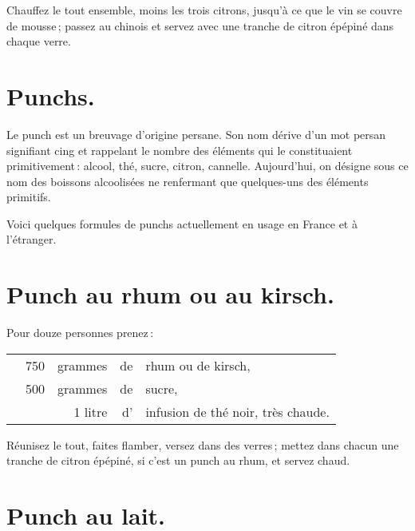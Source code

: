 Chauffez le tout ensemble, moins les trois citrons, jusqu'à ce que le vin se
couvre de mousse ; passez au chinois et servez avec une tranche de citron
épépiné dans chaque verre.

\section*{\centering Punchs.}
{}

Le punch est un breuvage d'origine persane. Son nom dérive d'un mot persan
signifiant cing et rappelant le nombre des éléments qui le constituaient
primitivement : alcool, thé, sucre, citron, cannelle. Aujourd'hui, on désigne
sous ce nom des boissons alcoolisées ne renfermant que quelques-uns des
éléments primitifs.

Voici quelques formules de punchs actuellement en usage en France et
à l'étranger.

\section*{\centering Punch au rhum ou au kirsch.}
{}

Pour douze personnes prenez :

\footnotesize
\begin{longtable}{rrrrp{16em}}
  & 750 & grammes & de & rhum ou de kirsch,                                                               \\
  & 500 & grammes & de & sucre,                                                                           \\
  & \multicolumn{2}{r}{1 litre} & d' & infusion de thé noir, très chaude.                                 \\
\end{longtable}
\normalsize

Réunisez le tout, faites flamber, versez dans des verres ; mettez dans chacun
une tranche de citron épépiné, si c'est un punch au rhum, et servez chaud.

\section*{\centering Punch au lait.}
{}

